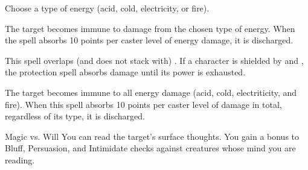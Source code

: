 \begin{spellheader}
    \spellspecial Choose a type of energy (acid, cold, electricity, or fire).
\end{spellheader}
\begin{spelleffects}
    \spelleffect The target becomes immune to damage from the chosen type of energy. When the spell absorbs 10 points per caster level of energy damage, it is discharged.
\end{spelleffects}
\begin{spellfooter}
    \spellnotes This spell overlaps (and does not stack with) . If a character is shielded by  and , the protection spell absorbs damage until its power is exhausted.
\end{spellfooter}

\begin{spellheader}
\end{spellheader}
\begin{spelleffects}
    \spelleffect The target becomes immune to all energy damage (acid, cold, electriticity, and fire). When this spell absorbs 10 points per caster level of damage in total, regardless of its type, it is discharged.
\end{spelleffects}
\begin{spellfooter}

\end{spellfooter}

\begin{comment}
\subsubsection{Q-R}
\end{comment}

\begin{spellheader}
    \spellrng{\rngmed}
\end{spellheader}
\begin{spelleffects}
    \begin{spellattack}{Magic vs. Will}
        \spellsuccess You can read the target's surface thoughts. You gain a  bonus to Bluff, Persuasion, and Intimidate checks against creatures whose mind you are reading.
    \end{spellattack}
\end{spelleffects}
\begin{spellfooter}

\end{spellfooter}

